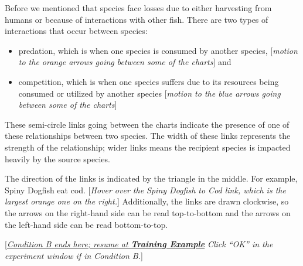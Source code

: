 {{{{\begin{minipage}{0.97\textwidth}
{Before we mentioned that species face losses due to either harvesting from humans or because of interactions with other fish.  There are two types of interactions that occur between species:

\begin{itemize}
\item predation, which is when one species is consumed by another species, [\textit{motion to the orange arrows going between some of the charts}] and
\item competition, which is when one species suffers due to its resources being consumed or utilized by another species [\textit{motion to the blue arrows going between some of the charts}]
\end{itemize}

These semi-circle links going between the charts indicate the presence of one of these relationships between two species.  The width of these links represents the strength of the relationship; wider links means the recipient species is impacted heavily by the source species.

The direction of the links is indicated by the triangle in the middle.  For example, Spiny Dogfish eat cod. [\textit{Hover over the Spiny Dogfish to Cod link, which is the largest orange one on the right.}]  Additionally, the links are drawn clockwise, so the arrows on the right-hand side can be read top-to-bottom and the arrows on the left-hand side can be read bottom-to-top.

[\underline{\textit{Condition B ends here; resume at \textbf{Training Example}}} \textit{Click ``OK'' in the experiment window if in Condition B.}]
}
\end{minipage}
}


}}}
